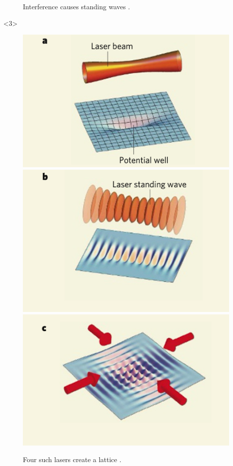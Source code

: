 \documentclass[aspectratio=169]{beamer}
\begin{document}
\begin{frame}
\begin{onlyenv}
\begin{figure}
        \caption{Interference causes standing waves \footnotemark[1].}
      \end{figure} 
    \end{onlyenv}
    \begin{onlyenv}<3>
      \begin{figure}
        \includegraphics[scale=0.25]{../img/Optical-lattice-creation-a.png} \includegraphics[scale=0.25]{../img/Optical-lattice-creation-b.png}\includegraphics[scale=0.25]{../img/Optical-lattice-creation-c.png}
        \caption{Four such lasers create a lattice \footnotemark[1].}
      \end{figure} 
    \end{onlyenv}
\end{frame}
\end{document}
